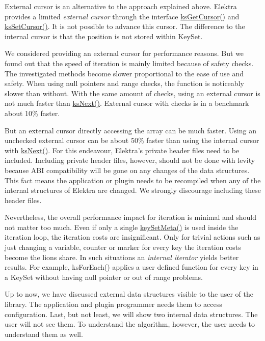 External cursor is an alternative to the approach explained above. Elektra provides a limited {\itshape external cursor} through the interface {\ttfamily \mbox{\hyperlink{group__keyset_gaffe507ab9281c322eb16c3e992075d29}{ks\+Get\+Cursor()}}} and {\ttfamily \mbox{\hyperlink{group__keyset_gad94c9ffaa3e8034564c0712fd407c345}{ks\+Set\+Cursor()}}}. It is not possible to advance this cursor. The difference to the internal cursor is that the position is not stored within {\ttfamily Key\+Set}.

We considered providing an external cursor for performance reasons. But we found out that the speed of iteration is mainly limited because of safety checks. The investigated methods become slower proportional to the ease of use and safety. When using null pointers and range checks, the function is noticeably slower than without. With the same amount of checks, using an external cursor is not much faster than {\ttfamily \mbox{\hyperlink{group__keyset_ga317321c9065b5a4b3e33fe1c399bcec9}{ks\+Next()}}}. External cursor with checks is in a benchmark about 10\% faster.

But an external cursor directly accessing the array can be much faster. Using an unchecked external cursor can be about 50\% faster than using the internal cursor with \mbox{\hyperlink{group__keyset_ga317321c9065b5a4b3e33fe1c399bcec9}{ks\+Next()}}. For this endeavour, Elektra’s private header files need to be included. Including private header files, however, should not be done with levity because A\+BI compatibility will be gone on any changes of the data structures. This fact means the application or plugin needs to be recompiled when any of the internal structures of Elektra are changed. We strongly discourage including these header files.

Nevertheless, the overall performance impact for iteration is minimal and should not matter too much. Even if only a single {\ttfamily \mbox{\hyperlink{group__keymeta_gae1f15546b234ffb6007d8a31178652b9}{key\+Set\+Meta()}}} is used inside the iteration loop, the iteration costs are insignificant. Only for trivial actions such as just changing a variable, counter or marker for every key the iteration costs become the lion\textquotesingle{}s share. In such situations an {\itshape internal iterator} yields better results. For example, {\ttfamily ks\+For\+Each()} applies a user defined function for every key in a {\ttfamily Key\+Set} without having null pointer or out of range problems.

Up to now, we have discussed external data structures visible to the user of the library. The application and plugin programmer needs them to access configuration. Last, but not least, we will show two internal data structures. The user will not see them. To understand the algorithm, however, the user needs to understand them as well.

